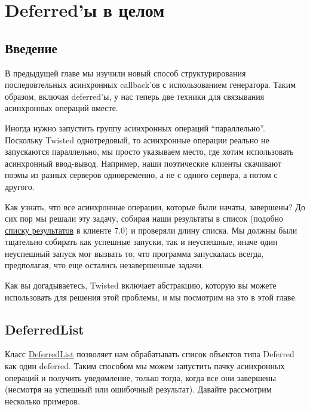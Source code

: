 

\section{Deferred'ы в целом\label{sec:part18}}

\subsection{Введение}


В предыдущей главе мы изучили новый способ структурирования 
последовтельных асинхронных callback'ов с использованием 
генератора. Таким образом, включая deferred'ы, у нас теперь две 
техники для связывания асинхронных операций вместе. 


Иногда нужно запустить группу асинхронных операций ``параллельно''. 
Поскольку Twisted однотредовый, то асинхронные операции 
реально не запускаются параллельно, мы просто указываем место, где  
хотим использовать асинхронный ввод-вывод. Например, наши поэтические 
клиенты скачивают поэмы из разных серверов одновременно, а не с одного 
сервера, а потом с другого.


Как узнать, что все асинхронные 
операции, которые были начаты, завершены? До сих пор 
мы решали эту задачу, собирая наши результаты в список (подобно 
\href{http://github.com/jdavisp3/twisted-intro/blob/master/twisted-client-7/get-poetry.py#L160}{списку результатов} 
в клиенте 7.0) и проверяли длину списка. 
Мы должны были тщательно собирать как успешные запуски, так и 
неуспешные, иначе один неуспешный запуск мог вызвать то, что программа 
запускалась всегда, предполагая, что еще остались незавершенные 
задачи.


Как вы догадываетесь, Twisted включает абстракцию, 
которую вы можете использовать для решения этой 
проблемы, и мы посмотрим на это в этой главе.


\subsection{DeferredList}

Класс \href{http://twistedmatrix.com/trac/browser/tags/releases/twisted-10.1.0/twisted/internet/defer.py#593}{DeferredList} позволяет нам обрабатывать список объектов типа Deferred как 
один deferred. Таким способом мы можем запустить пачку 
асинхронных операций и получить уведомление, только тогда, когда 
все они завершены (несмотря на успешный или ошибочный результат). 
Давайте рассмотрим несколько примеров.


